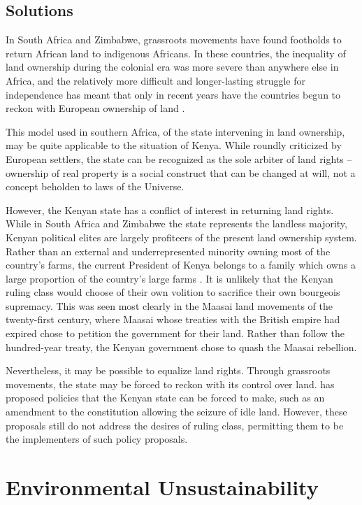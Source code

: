 \documentclass[american]{../../../coursework}
\begin{document}
\subsection{Solutions}

In South Africa and Zimbabwe, grassroots movements have found footholds to
return African land to indigenous Africans. In these countries, the inequality
of land ownership during the colonial era was more severe than anywhere else
in Africa, and the relatively more difficult and longer-lasting struggle for
independence has meant that only in recent years have the countries begun to
reckon with European ownership of land \parencite{Syagga2006}.

This model used in southern Africa, of the state intervening in land
ownership, may be quite applicable to the situation of Kenya. While roundly
criticized by European settlers, the state can be recognized as the sole
arbiter of land rights -- ownership of real property is a social construct
that can be changed at will, not a concept beholden to laws of the Universe.

However, the Kenyan state has a conflict of interest in returning land rights.
While in South Africa and Zimbabwe the state represents the landless majority,
Kenyan political elites are largely profiteers of the present land ownership
system. Rather than an external and underrepresented minority owning most of
the country's farms, the current President of Kenya belongs to a family which
owns a large proportion of the country's large farms
\parencite{Berg-Schlosser1982}. It is unlikely that the Kenyan ruling class
would choose of their own volition to sacrifice their own bourgeois supremacy.
This was seen most clearly in the Maasai land movements of the twenty-first
century, where Maasai whose treaties with the British empire had expired chose
to petition the government for their land. Rather than follow the hundred-year
treaty, the Kenyan government chose to quash the Maasai rebellion.

Nevertheless, it may be possible to equalize land rights. Through grassroots
movements, the state may be forced to reckon with its control over land.
\textcite{Syagga2006} has proposed policies that the Kenyan state can be
forced to make, such as an amendment to the constitution allowing the seizure
of idle land. However, these proposals still do not address the desires of
ruling class, permitting them to be the implementers of such policy proposals.

\section{Environmental Unsustainability}
\end{document}
